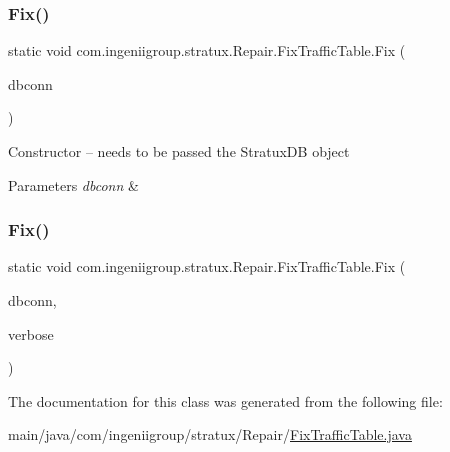 \mbox{\label{classcom_1_1ingeniigroup_1_1stratux_1_1_repair_1_1_fix_traffic_table_ac1cbfba669e1e58185840d39af28f10d}} 
\subsubsection{\texorpdfstring{Fix()}{Fix()}\hspace{0.1cm}{\footnotesize\ttfamily [1/2]}}
{\footnotesize\ttfamily static void com.\+ingeniigroup.\+stratux.\+Repair.\+Fix\+Traffic\+Table.\+Fix (\begin{DoxyParamCaption}\item[{\hyperlink{classcom_1_1ingeniigroup_1_1stratux_1_1db_connect_1_1_stratux_d_b}{Stratux\+DB}}]{dbconn }\end{DoxyParamCaption})\hspace{0.3cm}{\ttfamily [static]}}

Constructor -- needs to be passed the Stratux\+DB object


\begin{DoxyParams}{Parameters}
{\em dbconn} & \\
\hline
\end{DoxyParams}
\mbox{\label{classcom_1_1ingeniigroup_1_1stratux_1_1_repair_1_1_fix_traffic_table_af2aa2903bf66fd61b674a1027393019d}} 
\subsubsection{\texorpdfstring{Fix()}{Fix()}\hspace{0.1cm}{\footnotesize\ttfamily [2/2]}}
{\footnotesize\ttfamily static void com.\+ingeniigroup.\+stratux.\+Repair.\+Fix\+Traffic\+Table.\+Fix (\begin{DoxyParamCaption}\item[{\hyperlink{classcom_1_1ingeniigroup_1_1stratux_1_1db_connect_1_1_stratux_d_b}{Stratux\+DB}}]{dbconn,  }\item[{boolean}]{verbose }\end{DoxyParamCaption})\hspace{0.3cm}{\ttfamily [static]}}



The documentation for this class was generated from the following file\+:\begin{DoxyCompactItemize}
\item 
main/java/com/ingeniigroup/stratux/\+Repair/\hyperlink{_fix_traffic_table_8java}{Fix\+Traffic\+Table.\+java}\end{DoxyCompactItemize}
